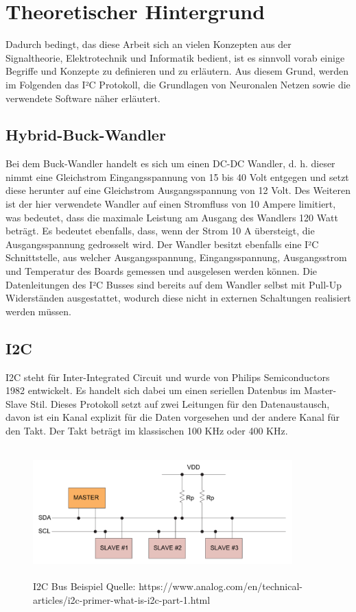 \section{Theoretischer Hintergrund}
Dadurch bedingt, das diese Arbeit sich an vielen Konzepten aus der Signaltheorie, Elektrotechnik und Informatik bedient, ist es sinnvoll vorab einige Begriffe und Konzepte zu definieren und zu erläutern. Aus diesem Grund, werden im Folgenden das I²C Protokoll, die Grundlagen von Neuronalen Netzen sowie die verwendete Software näher erläutert. 

\subsection{Hybrid-Buck-Wandler}
Bei dem Buck-Wandler handelt es sich um einen DC-DC Wandler, d. h. dieser nimmt eine Gleichstrom Eingangsspannung von 15 bis 40 Volt entgegen und setzt diese herunter auf eine Gleichstrom Ausgangsspannung von 12 Volt. Des Weiteren ist der hier verwendete Wandler auf einen Stromfluss von 10 Ampere limitiert, was bedeutet, dass die maximale Leistung am Ausgang des Wandlers 120 Watt beträgt. Es bedeutet ebenfalls, dass, wenn der Strom 10 A übersteigt, die Ausgangsspannung gedrosselt wird.
Der Wandler besitzt ebenfalls eine I²C Schnittstelle, aus welcher Ausgangsspannung, Eingangsspannung, Ausgangsstrom und Temperatur des Boards gemessen und ausgelesen werden können. Die Datenleitungen des I²C Busses sind bereits auf dem Wandler selbst mit Pull-Up Widerständen ausgestattet, wodurch diese nicht in externen Schaltungen realisiert werden müssen. 

\subsection{I2C}
I2C steht für Inter-Integrated Circuit und wurde von Philips Semiconductors 1982 entwickelt. Es handelt sich dabei um einen seriellen Datenbus im Master-Slave Stil. Dieses Protokoll setzt auf zwei Leitungen für den Datenaustausch, davon ist ein Kanal explizit für die Daten vorgesehen und der andere Kanal für den Takt. Der Takt beträgt im klassischen 100 KHz oder 400 KHz. 

\begin{figure}
    \centering
    \includegraphics[height= 5cm, width = 10cm]{Pictures/I2C_Bus.png}
    \caption{I2C Bus Beispiel Quelle: https://www.analog.com/en/technical-articles/i2c-primer-what-is-i2c-part-1.html}
\end{figure}

